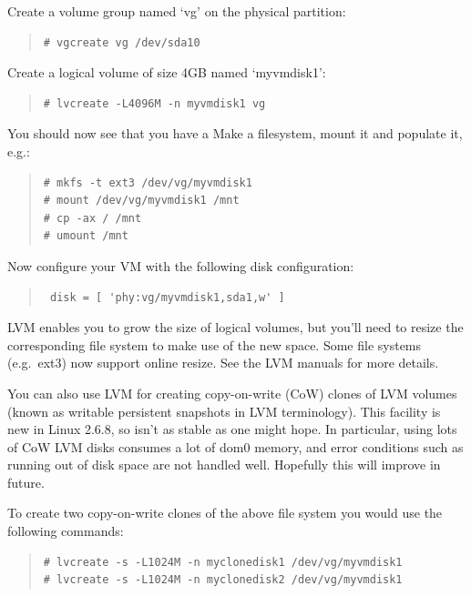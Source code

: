 \documentclass[11pt,twoside,final,openright]{report}
\begin{document}
Create a volume group named `vg' on the physical partition:
\begin{quote}
\begin{verbatim}
# vgcreate vg /dev/sda10
\end{verbatim} 
\end{quote}

Create a logical volume of size 4GB named `myvmdisk1':
\begin{quote}
\begin{verbatim}
# lvcreate -L4096M -n myvmdisk1 vg
\end{verbatim}
\end{quote}

You should now see that you have a  Make a
filesystem, mount it and populate it, e.g.:
\begin{quote}
\begin{verbatim}
# mkfs -t ext3 /dev/vg/myvmdisk1
# mount /dev/vg/myvmdisk1 /mnt
# cp -ax / /mnt
# umount /mnt
\end{verbatim}
\end{quote}

Now configure your VM with the following disk configuration:
\begin{quote}
\begin{verbatim}
 disk = [ 'phy:vg/myvmdisk1,sda1,w' ]
\end{verbatim}
\end{quote}

LVM enables you to grow the size of logical volumes, but you'll need
to resize the corresponding file system to make use of the new space.
Some file systems (e.g.\ ext3) now support online resize.  See the LVM
manuals for more details.

You can also use LVM for creating copy-on-write (CoW) clones of LVM
volumes (known as writable persistent snapshots in LVM terminology).
This facility is new in Linux 2.6.8, so isn't as stable as one might
hope.  In particular, using lots of CoW LVM disks consumes a lot of
dom0 memory, and error conditions such as running out of disk space
are not handled well. Hopefully this will improve in future.

To create two copy-on-write clones of the above file system you would
use the following commands:

\begin{quote}
\begin{verbatim}
# lvcreate -s -L1024M -n myclonedisk1 /dev/vg/myvmdisk1
# lvcreate -s -L1024M -n myclonedisk2 /dev/vg/myvmdisk1
\end{verbatim}
\end{quote}
\end{document}
